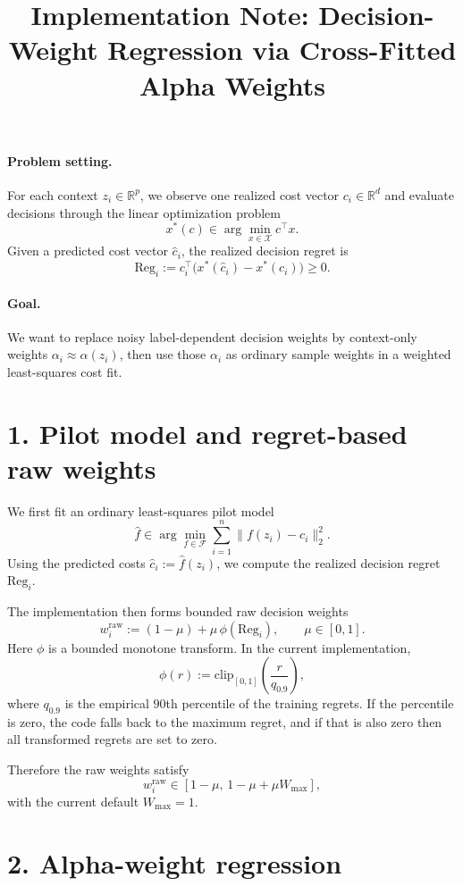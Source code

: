 \documentclass[11pt]{article}
\title{Implementation Note: Decision-Weight Regression via Cross-Fitted Alpha Weights}
\date{}
\newcommand{\R}{\mathbb{R}}
\newcommand{\clip}{\mathrm{clip}}
\newcommand{\Reg}{\mathrm{Reg}}
\begin{document}
\maketitle

\paragraph{Problem setting.}
For each context $z_i \in \R^p$, we observe one realized cost vector
$c_i \in \R^d$ and evaluate decisions through the linear optimization problem
\[
  x^*(c) \in \arg\min_{x \in \mathcal{X}} c^\top x.
\]
Given a predicted cost vector $\hat c_i$, the realized decision regret is
\[
  \Reg_i
  := c_i^\top\!\bigl(x^*(\hat c_i) - x^*(c_i)\bigr)
  \ge 0.
\]

\paragraph{Goal.}
We want to replace noisy label-dependent decision weights by context-only
weights $\alpha_i \approx \alpha(z_i)$, then use those $\alpha_i$ as ordinary
sample weights in a weighted least-squares cost fit.

\section*{1. Pilot model and regret-based raw weights}

We first fit an ordinary least-squares pilot model
\[
  \hat f \in \arg\min_{f \in \mathcal{F}}
  \sum_{i=1}^n \|f(z_i) - c_i\|_2^2.
\]
Using the predicted costs $\hat c_i := \hat f(z_i)$, we compute the realized
decision regret $\Reg_i$.

The implementation then forms bounded raw decision weights
\[
  w_i^{\mathrm{raw}}
  := (1-\mu) + \mu \, \phi(\Reg_i),
  \qquad \mu \in [0,1].
\]
Here $\phi$ is a bounded monotone transform. In the current implementation,
\[
  \phi(r) := \clip_{[0,1]}\!\left(\frac{r}{q_{0.9}}\right),
\]
where $q_{0.9}$ is the empirical $90$th percentile of the training regrets.
If the percentile is zero, the code falls back to the maximum regret, and if
that is also zero then all transformed regrets are set to zero.

Therefore the raw weights satisfy
\[
  w_i^{\mathrm{raw}} \in [1-\mu,\,1-\mu+\mu W_{\max}],
\]
with the current default $W_{\max}=1$.

\section*{2. Alpha-weight regression}
\end{document}
